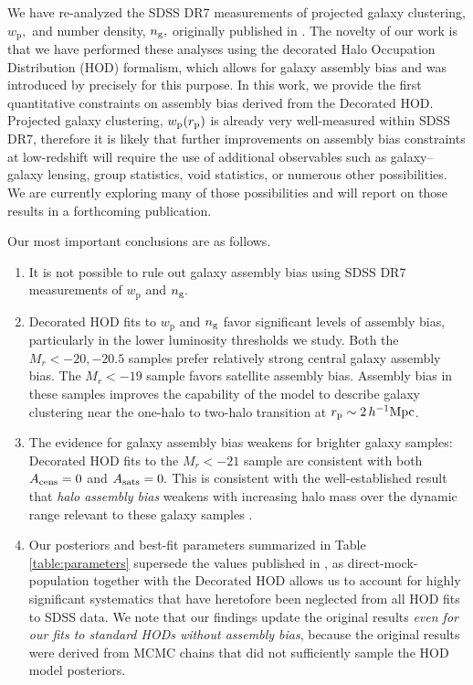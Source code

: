 \documentclass[usenatbib,usegraphicx,letterpaper]{mn2e}
\newcommand{\wprp}{w_{\mathrm{p}}}
\newcommand{\magr}{M_r}
\newcommand{\ben}{\begin{enumerate}}
\newcommand{\een}{\end{enumerate}}
\begin{document}
We have re-analyzed the SDSS DR7 measurements of projected galaxy clustering,
$\wprp,$ and number density, $n_{\rm g},$ originally published in \citet{zehavi_etal11}.
The novelty of our work is that we have performed these analyses using the
decorated Halo Occupation Distribution (HOD) formalism, which allows for galaxy
assembly bias and was introduced by \citet{hearin_etal16} precisely for this purpose.
In this work, we provide the first quantitative constraints on
assembly bias derived from the Decorated HOD. Projected galaxy clustering, 
$\wprp(r_{\rm p})$ is already very well-measured within SDSS DR7, therefore it is likely 
that further improvements on assembly bias constraints at low-redshift will require the use of additional 
observables such as galaxy--galaxy lensing, group statistics, void statistics, or numerous other possibilities. 
We are currently exploring many of those possibilities and will report on those results in a forthcoming publication. 

Our most important conclusions are as follows.
%
\ben
%
\item It is not possible to rule out galaxy assembly bias using SDSS DR7 measurements of $\wprp$ and $n_{\rm g}.$
%
\item Decorated HOD fits to $\wprp$ and $n_{\rm g}$ favor significant levels of assembly bias, particularly in the lower luminosity thresholds we study. Both the $\magr<-20, -20.5$ samples prefer relatively strong central galaxy assembly bias. The $\magr<-19$ sample favors satellite assembly bias. Assembly bias in these samples improves the capability of the model to describe galaxy clustering near
the one-halo to two-halo transition at $r_{\rm p} \sim 2 \, h^{-1}\mathrm{Mpc}$.
%
\item The evidence for galaxy assembly bias weakens for brighter galaxy samples: Decorated HOD fits to the $\magr<-21$ sample are consistent with both $A_{\rm cens}=0$ and $A_{\rm sats}=0.$ This is consistent with the well-established result that
{\em halo assembly bias} weakens with increasing halo mass over the dynamic range relevant to these galaxy samples
\citep[see, e.g., Figure 8 of][and references therein]{hearin_etal16}.
%
\item Our posteriors and best-fit parameters summarized in
Table \ref{table:parameters} supersede the values published in \citet{zehavi_etal11},
as direct-mock-population together with the Decorated HOD allows us to account for
highly significant systematics that have heretofore been neglected from all HOD fits to SDSS data.
We note that our findings update the original \citet{zehavi_etal11} results
{\em even for our fits to standard HODs without assembly bias}, because
the original results were derived from MCMC chains that did not sufficiently sample the HOD model posteriors.
%
\een
%
\end{document}
